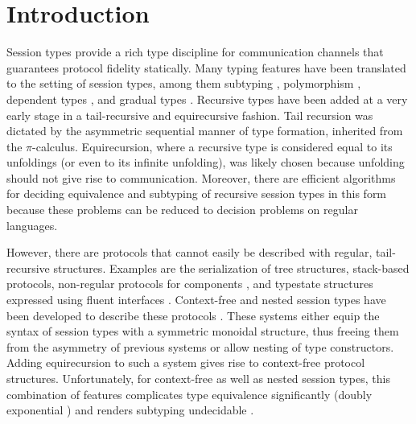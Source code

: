 \section{Introduction}
\label{sec:introduction-old}

Session types
\cite{DBLP:conf/concur/Honda93,DBLP:conf/parle/TakeuchiHK94} provide a
rich type discipline for communication channels that guarantees
protocol fidelity statically. Many typing features have been
translated to the setting of session types, among them subtyping
\cite{DBLP:journals/acta/GayH05}, polymorphism
\cite{lindley17:_light_funct_session_types}, dependent types
\cite{DBLP:conf/ppdp/ToninhoCP11,DBLP:conf/fossacs/ToninhoY18,DBLP:journals/pacmpl/ThiemannV20},
and gradual types \cite{DBLP:journals/jfp/IgarashiTTVW19}. Recursive
types have been added at a very early stage
\cite{DBLP:conf/esop/HondaVK98} in a tail-recursive and equirecursive
fashion. Tail recursion was dictated by the asymmetric sequential manner of type
formation, inherited from the $\pi$-calculus. Equirecursion, where a
recursive type is considered equal to its unfoldings (or even to its
infinite unfolding), was likely chosen because unfolding should not
give rise to communication.  Moreover, there are efficient algorithms
for deciding equivalence and subtyping of recursive session types in
this form because these problems can be reduced to decision problems
on regular languages. 

However, there are protocols that cannot easily be described with
regular, tail-recursive structures. Examples are the serialization of
tree structures, stack-based protocols, non-regular protocols for
components \cite{DBLP:conf/soco/Sudholt05}, and typestate structures expressed
using fluent interfaces
\cite{DBLP:conf/ecoop/GilL16,DBLP:conf/oopsla/Xie17}.
Context-free and nested session types have been developed to  describe
these protocols
\cite{DBLP:conf/icfp/ThiemannV16,DBLP:conf/esop/Padovani17,DBLP:journals/toplas/Padovani19,DBLP:journals/corr/abs-2106-06658, DBLP:conf/esop/DasDMP21}. These
systems either equip the syntax of session types with a symmetric monoidal structure,
thus freeing them from the asymmetry of previous systems or allow
nesting of type constructors. Adding
equirecursion to such a system gives rise to context-free protocol
structures. Unfortunately, for context-free as well as nested
session types, this combination of features complicates type equivalence
significantly (doubly exponential \cite{DBLP:conf/esop/DasDMP21}) and
renders subtyping undecidable \cite{DBLP:journals/toplas/Padovani19}.

